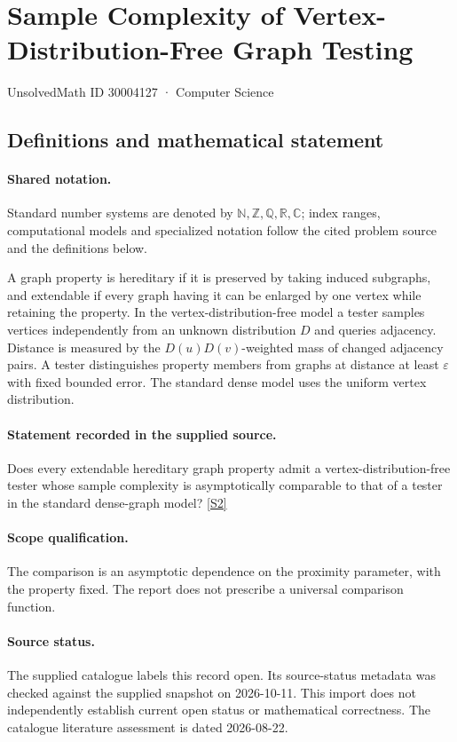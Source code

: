 \documentclass[11pt]{article}
\newcommand{\sref}[2]{\hyperlink{source:#1:#2}{[S#2]}}
\begin{document}
\setcounter{section}{30004126}
\section{Sample Complexity of Vertex-Distribution-Free Graph Testing}\label{30004127}
{\small\sffamily UnsolvedMath ID 30004127 · Computer Science}
\subsection{Definitions and mathematical statement}

\paragraph{Shared notation.}Standard number systems are denoted by $\mathbb N,\mathbb Z,\mathbb Q,\mathbb R,\mathbb C$; index ranges, computational models and specialized notation follow the cited problem source and the definitions below.


A graph property is hereditary if it is preserved by taking induced subgraphs, and extendable if every graph having it can be enlarged by one vertex while retaining the property. In the vertex-distribution-free model a tester samples vertices independently from an unknown distribution $D$ and queries adjacency. Distance is measured by the $D(u)D(v)$-weighted mass of changed adjacency pairs. A tester distinguishes property members from graphs at distance at least $\varepsilon$ with fixed bounded error. The standard dense model uses the uniform vertex distribution.
\paragraph{Statement recorded in the supplied source.}
Does every extendable hereditary graph property admit a vertex-distribution-free tester whose sample complexity is asymptotically comparable to that of a tester in the standard dense-graph model? \sref{30004127}{2}
\paragraph{Scope qualification.}
The comparison is an asymptotic dependence on the proximity parameter, with the property fixed. The report does not prescribe a universal comparison function.
\paragraph{Source status.}
The supplied catalogue labels this record open. Its source-status metadata was checked against the supplied snapshot on 2026-10-11. This import does not independently establish current open status or mathematical correctness. The catalogue literature assessment is dated 2026-08-22.
\end{document}
